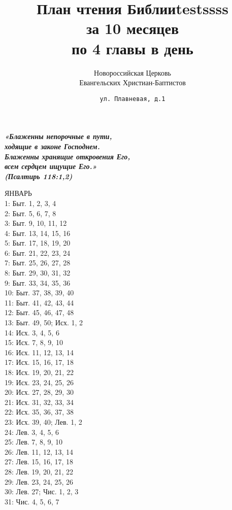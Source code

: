 \documentclass[fontsize=16pt,letterpaper,DIV=6]{scrartcl}
\title{План чтения Библииtestssss \\за 10 месяцев \\по 4 главы в день}
\author{Новороссийская Церковь\\Евангельских Христиан-Баптистов}
\date{\texttt{ул. Плавневая, д.1}}
\begin{document}
\maketitle
\setcounter{page}{0}
\thispagestyle{empty}
\clearpage
{}
{\centering\Large\itshape\bfseries «Блаженны непорочные в пути,\\ ходящие в законе Господнем.\\
Блаженны хранящие откровения Его,\\ всем сердцем ищущие Его.»\\
(Псалтирь 118:1,2)
\par}
\clearpage
\begin{multicols}{2}
ЯНВАРЬ
\\  1: Быт. 1, 2, 3, 4
\\  2: Быт. 5, 6, 7, 8
\\  3: Быт. 9, 10, 11, 12
\\  4: Быт. 13, 14, 15, 16
\\  5: Быт. 17, 18, 19, 20
\\  6: Быт. 21, 22, 23, 24
\\  7: Быт. 25, 26, 27, 28
\\  8: Быт. 29, 30, 31, 32
\\  9: Быт. 33, 34, 35, 36
\\  10: Быт. 37, 38, 39, 40
\\  11: Быт. 41, 42, 43, 44
\\  12: Быт. 45, 46, 47, 48
\\  13: Быт. 49, 50; Исх. 1, 2
\\  14: Исх. 3, 4, 5, 6
\\  15: Исх. 7, 8, 9, 10
\\  16: Исх. 11, 12, 13, 14
\\  17: Исх. 15, 16, 17, 18
\\  18: Исх. 19, 20, 21, 22
\\  19: Исх. 23, 24, 25, 26
\\  20: Исх. 27, 28, 29, 30
\\  21: Исх. 31, 32, 33, 34
\\  22: Исх. 35, 36, 37, 38
\\  23: Исх. 39, 40; Лев. 1, 2
\\  24: Лев. 3, 4, 5, 6
\\  25: Лев. 7, 8, 9, 10
\\  26: Лев. 11, 12, 13, 14
\\  27: Лев. 15, 16, 17, 18
\\  28: Лев. 19, 20, 21, 22
\\  29: Лев. 23, 24, 25, 26
\\  30: Лев. 27; Чис. 1, 2, 3
\\  31: Чис. 4, 5, 6, 7


\end{multicols}
\end{document}
